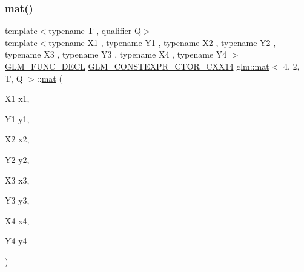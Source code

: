 \mbox{\label{structglm_1_1mat_3_014_00_012_00_01_t_00_01_q_01_4_ab215b674606585326f67e984d3eaf832}} 
\subsubsection{\texorpdfstring{mat()}{mat()}\hspace{0.1cm}{\footnotesize\ttfamily [7/21]}}
{\footnotesize\ttfamily template$<$typename T , qualifier Q$>$ \\
template$<$typename X1 , typename Y1 , typename X2 , typename Y2 , typename X3 , typename Y3 , typename X4 , typename Y4 $>$ \\
\hyperlink{setup_8hpp_ab2d052de21a70539923e9bcbf6e83a51}{G\+L\+M\+\_\+\+F\+U\+N\+C\+\_\+\+D\+E\+CL} \hyperlink{setup_8hpp_a0900f9145e68bf6061b6f5e7be3fa751}{G\+L\+M\+\_\+\+C\+O\+N\+S\+T\+E\+X\+P\+R\+\_\+\+C\+T\+O\+R\+\_\+\+C\+X\+X14} \hyperlink{structglm_1_1mat}{glm\+::mat}$<$ 4, 2, T, Q $>$\+::\hyperlink{structglm_1_1mat}{mat} (\begin{DoxyParamCaption}\item[{X1}]{x1,  }\item[{Y1}]{y1,  }\item[{X2}]{x2,  }\item[{Y2}]{y2,  }\item[{X3}]{x3,  }\item[{Y3}]{y3,  }\item[{X4}]{x4,  }\item[{Y4}]{y4 }\end{DoxyParamCaption})}

\mbox{\label{structglm_1_1mat_3_014_00_012_00_01_t_00_01_q_01_4_a0a0b79d10d539aafa1d3985616846568}} 
